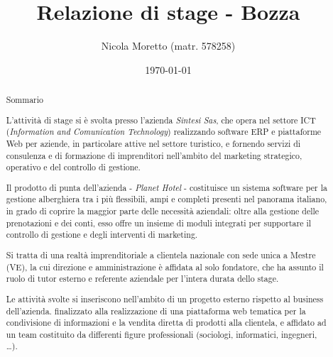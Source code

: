 \documentclass[11pt,a4paper,headsepline,hidelinks,draft]{scrreprt} %
\begin{document}
  \title{Relazione di stage - Bozza}
	\subject{Analisi e progettazione di un'interfaccia grafica per la consultazione dei contenuti informativi in una piattaforma web tematica}
  \author{Nicola Moretto (matr. 578258)}
  \date{\today}

  \maketitle

	\tableofcontents

	\listoffigures
	\begingroup
	\let\clearpage\relax
	\listoftables
	\endgroup
	
	\begin{abstract}
	\chapter*{Sommario}
	L'attività di stage si è svolta presso l'azienda \textit{Sintesi Sas}, che opera nel settore ICT (\textit{Information and Comunication Technology}) realizzando software ERP e piattaforme Web per aziende, in particolare attive nel settore turistico, e fornendo servizi di consulenza e di formazione di imprenditori nell'ambito del marketing strategico, operativo e del controllo di gestione.
	
	Il prodotto di punta dell'azienda - \textit{Planet Hotel} - costituisce un sistema software per la gestione alberghiera tra i più flessibili, ampi e completi presenti nel panorama italiano, in grado di coprire la maggior parte delle necessità aziendali: oltre alla gestione delle prenotazioni e dei conti, esso offre un insieme di moduli integrati per supportare il controllo di gestione e degli interventi di marketing.

	Si tratta di una realtà imprenditoriale a clientela nazionale con sede unica a Mestre (VE), la cui direzione e amministrazione è affidata al solo fondatore, che ha assunto il ruolo di tutor esterno e referente aziendale per l'intera durata dello stage.

	Le attività svolte si inseriscono nell'ambito di un progetto esterno rispetto al business dell'azienda. finalizzato alla realizzazione di una piattaforma web tematica per la condivisione di informazioni e la vendita diretta di prodotti alla clientela, e affidato ad un team costituito da differenti figure professionali (sociologi, informatici, ingegneri, \ldots).
	

\end{abstract}
\end{document}

